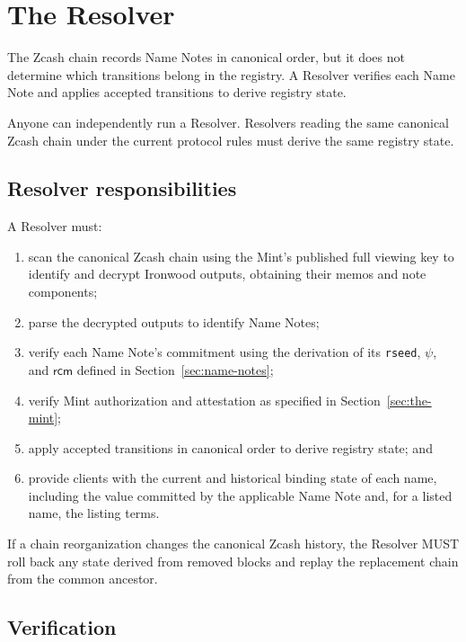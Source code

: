 \section{The Resolver}
\label{sec:resolver}

The Zcash chain records Name Notes in canonical order, but it does not determine which transitions belong in the registry. A Resolver verifies each Name Note and applies accepted transitions to derive registry state.

Anyone can independently run a Resolver. Resolvers reading the same canonical Zcash chain under the current protocol rules must derive the same registry state.

\subsection{Resolver responsibilities}

A Resolver must:

\begin{enumerate}
  \item scan the canonical Zcash chain using the Mint's published full viewing key to identify and decrypt Ironwood outputs, obtaining their memos and note components;
  \item parse the decrypted outputs to identify Name Notes;
  \item verify each Name Note's commitment using the derivation of its \texttt{rseed}, $\psi$, and $\mathsf{rcm}$ defined in Section~\ref{sec:name-notes};
  \item verify Mint authorization and attestation as specified in Section~\ref{sec:the-mint};
  \item apply accepted transitions in canonical order to derive registry state; and
  \item provide clients with the current and historical binding state of each name, including the  value committed by the applicable Name Note and, for a listed name, the listing terms.
\end{enumerate}

If a chain reorganization changes the canonical Zcash history, the Resolver MUST roll back any state derived from removed blocks and replay the replacement chain from the common ancestor.

\subsection{Verification}

